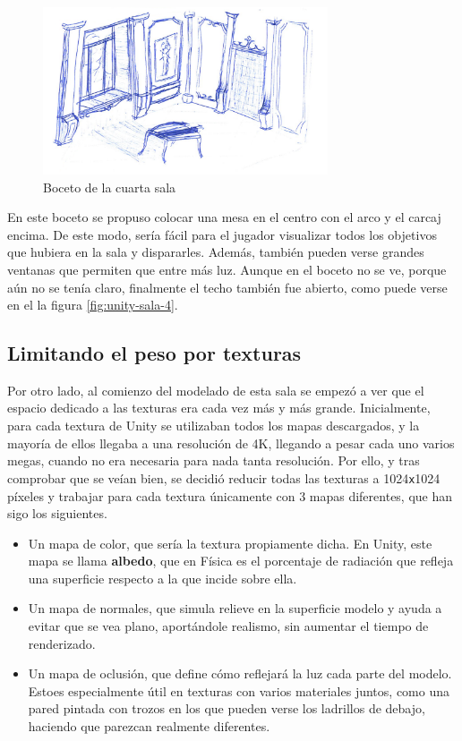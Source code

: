 \begin{figure}[!h]
\begin{center}
\includegraphics[width=0.75\textwidth]{imagenes/7/bocetos/boceto-sala-4.png}
\caption{Boceto de la cuarta sala}
\label{fig:boceto-sala-4}
\end{center}
\end{figure}

En este boceto se propuso colocar una mesa en el centro con el arco y el carcaj encima. De este modo, sería fácil para el jugador visualizar todos los objetivos que hubiera en la sala y dispararles. Además, también pueden verse grandes ventanas que permiten que entre más luz. Aunque en el boceto no se ve, porque aún no se tenía claro, finalmente el techo también fue abierto, como puede verse en el la figura \ref{fig:unity-sala-4}.

\subsection{Limitando el peso por texturas}

Por otro lado, al comienzo del modelado de esta sala se empezó a ver que el espacio dedicado a las texturas era cada vez más y más grande. Inicialmente, para cada textura de Unity se utilizaban todos los mapas descargados, y la mayoría de ellos llegaba a una resolución de 4K, llegando a pesar cada uno varios megas, cuando no era necesaria para nada tanta resolución. Por ello, y tras comprobar que se veían bien, se decidió reducir todas las texturas a 1024\texttt{x}1024 píxeles y trabajar para cada textura únicamente con 3 mapas diferentes, que han sigo los siguientes.

\begin{itemize}
    \item Un mapa de color, que sería la textura propiamente dicha. En Unity, este mapa se llama \textbf{albedo}, que en Física es el porcentaje de radiación que refleja una superficie respecto a la que incide sobre ella.
    \item Un mapa de normales, que simula relieve en la superficie modelo y ayuda a evitar que se vea plano, aportándole realismo, sin aumentar el tiempo de renderizado.
    \item Un mapa de oclusión, que define cómo reflejará la luz cada parte del modelo. Estoes especialmente útil en texturas con varios materiales juntos, como una pared pintada con trozos en los que pueden verse los ladrillos de debajo, haciendo que parezcan realmente diferentes.
\end{itemize}

